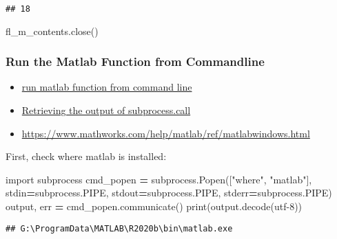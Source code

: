 \documentclass[
]{book}
\newenvironment{Shaded}{\begin{snugshade}}{\end{snugshade}}
\newcommand{\BuiltInTok}[1]{#1}
\newcommand{\ImportTok}[1]{#1}
\newcommand{\NormalTok}[1]{#1}
\newcommand{\OperatorTok}[1]{\textcolor[rgb]{0.81,0.36,0.00}{\textbf{#1}}}
\newcommand{\StringTok}[1]{\textcolor[rgb]{0.31,0.60,0.02}{#1}}
\providecommand{\tightlist}{%
  \setlength{\itemsep}{0pt}\setlength{\parskip}{0pt}}
\begin{document}
\begin{verbatim}
## 18
\end{verbatim}

\begin{Shaded}
\begin{Highlighting}[]
\NormalTok{fl\_m\_contents.close()}
\end{Highlighting}
\end{Shaded}

\hypertarget{run-the-matlab-function-from-commandline}{%
\subsubsection{Run the Matlab Function from Commandline}\label{run-the-matlab-function-from-commandline}}

\begin{itemize}
\tightlist
\item
  \href{https://www.mathworks.com/matlabcentral/answers/327116-run-function-from-command-line}{run matlab function from command line}
\item
  \href{https://stackoverflow.com/a/1996540/8280804}{Retrieving the output of subprocess.call}
\item
  \url{https://www.mathworks.com/help/matlab/ref/matlabwindows.html}
\end{itemize}

First, check where matlab is installed:

\begin{Shaded}
\begin{Highlighting}[]
\ImportTok{import}\NormalTok{ subprocess}
\NormalTok{cmd\_popen }\OperatorTok{=}\NormalTok{ subprocess.Popen([}\StringTok{"where"}\NormalTok{, }\StringTok{"matlab"}\NormalTok{],}
\NormalTok{                             stdin}\OperatorTok{=}\NormalTok{subprocess.PIPE,}
\NormalTok{                             stdout}\OperatorTok{=}\NormalTok{subprocess.PIPE,}
\NormalTok{                             stderr}\OperatorTok{=}\NormalTok{subprocess.PIPE)}
\NormalTok{output, err }\OperatorTok{=}\NormalTok{ cmd\_popen.communicate()}
\BuiltInTok{print}\NormalTok{(output.decode(}\StringTok{\textquotesingle{}utf{-}8\textquotesingle{}}\NormalTok{))}
\end{Highlighting}
\end{Shaded}

\begin{verbatim}
## G:\ProgramData\MATLAB\R2020b\bin\matlab.exe
\end{verbatim}
\end{document}
